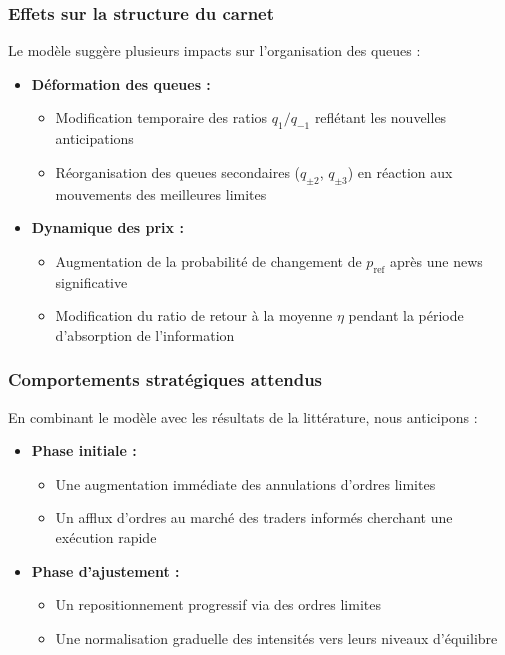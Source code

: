 \documentclass[12pt,a4paper]{article}
\theoremstyle{definition}
\theoremstyle{remark}
\begin{document}
    \subsubsection{Effets sur la structure du carnet}

    Le modèle suggère plusieurs impacts sur l'organisation des queues :

    \begin{itemize}
        \item \textbf{Déformation des queues :}
        \begin{itemize}
            \item Modification temporaire des ratios $q_1/q_{-1}$ reflétant les nouvelles anticipations
            \item Réorganisation des queues secondaires ($q_{\pm2}$, $q_{\pm3}$) en réaction aux mouvements des meilleures limites
        \end{itemize}
        
        \item \textbf{Dynamique des prix :}
        \begin{itemize}
            \item Augmentation de la probabilité de changement de $p_{\text{ref}}$ après une news significative
            \item Modification du ratio de retour à la moyenne $\eta$ pendant la période d'absorption de l'information
        \end{itemize}
    \end{itemize}

    \subsubsection{Comportements stratégiques attendus}

    En combinant le modèle avec les résultats de la littérature, nous anticipons :

    \begin{itemize}
        \item \textbf{Phase initiale :}
        \begin{itemize}
            \item Une augmentation immédiate des annulations d'ordres limites
            \item Un afflux d'ordres au marché des traders informés cherchant une exécution rapide
        \end{itemize}
        
        \item \textbf{Phase d'ajustement :}
        \begin{itemize}
            \item Un repositionnement progressif via des ordres limites
            \item Une normalisation graduelle des intensités vers leurs niveaux d'équilibre
        \end{itemize}
    \end{itemize}
\end{document}
